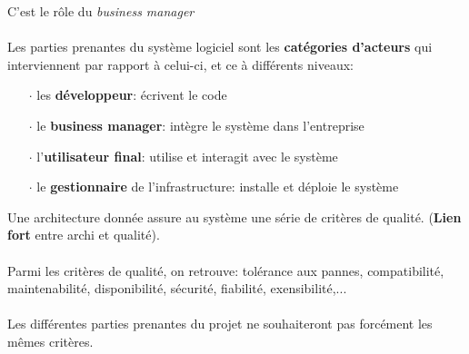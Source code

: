 \item{}
{\faux}
C'est le rôle du \textit{business manager}
\paragraph{}
{Les parties prenantes du système logiciel sont les \textbf{catégories d'acteurs} qui interviennent par rapport à celui-ci, et ce à différents niveaux:
\begin{itemize}\setlength{\itemsep}{.3em}
\item[$\cdot$]les \textbf{développeur}: écrivent le code
\item[$\cdot$]le \textbf{business manager}: intègre le système dans l'entreprise
\item[$\cdot$]l'\textbf{utilisateur final}: utilise et interagit avec le système
\item[$\cdot$]le \textbf{gestionnaire} de l'infrastructure: installe et déploie le système
\end{itemize}
}


\item{}
{\vrai}
{}


\item{}
{\vrai}
{Une architecture donnée assure au système une série de critères de qualité. (\textbf{Lien fort} entre archi et qualité).
\paragraph{}
Parmi les critères de qualité, on retrouve: tolérance aux pannes, compatibilité, maintenabilité, disponibilité, sécurité, fiabilité, exensibilité,...
\paragraph{}
Les différentes parties prenantes du projet ne souhaiteront pas forcément les mêmes critères.
}


